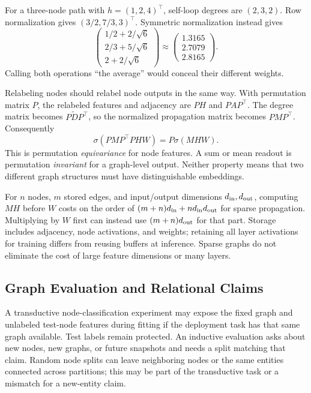 For a three-node path with $h=(1,2,4)^\top$, self-loop degrees are $(2,3,2)$. Row normalization gives $(3/2,7/3,3)^\top$. Symmetric normalization instead gives
\[
 \begin{pmatrix}
 1/2+2/\sqrt6\\[2pt]
 2/3+5/\sqrt6\\[2pt]
 2+2/\sqrt6
 \end{pmatrix}
 \approx\begin{pmatrix}1.3165\\2.7079\\2.8165\end{pmatrix}.
\]
Calling both operations ``the average'' would conceal their different weights.

Relabeling nodes should relabel node outputs in the same way. With permutation matrix $P$, the relabeled features and adjacency are $PH$ and $PAP^\top$. The degree matrix becomes $P\widetilde DP^\top$, so the normalized propagation matrix becomes $PMP^\top$. Consequently
\[
 \sigma(PMP^\top PHW)=P\sigma(MHW).
\]
This is permutation \emph{equivariance} for node features. A sum or mean readout is permutation \emph{invariant} for a graph-level output. Neither property means that two different graph structures must have distinguishable embeddings.

For $n$ nodes, $m$ stored edges, and input/output dimensions $d_{\rm in},d_{\rm out}$, computing $MH$ before $W$ costs on the order of $(m+n)d_{\rm in}+nd_{\rm in}d_{\rm out}$ for sparse propagation. Multiplying by $W$ first can instead use $(m+n)d_{\rm out}$ for that part. Storage includes adjacency, node activations, and weights; retaining all layer activations for training differs from reusing buffers at inference. Sparse graphs do not eliminate the cost of large feature dimensions or many layers.

\subsection{Graph Evaluation and Relational Claims}

A transductive node-classification experiment may expose the fixed graph and unlabeled test-node features during fitting if the deployment task has that same graph available. Test labels remain protected. An inductive evaluation asks about new nodes, new graphs, or future snapshots and needs a split matching that claim. Random node splits can leave neighboring nodes or the same entities connected across partitions; this may be part of the transductive task or a mismatch for a new-entity claim.

